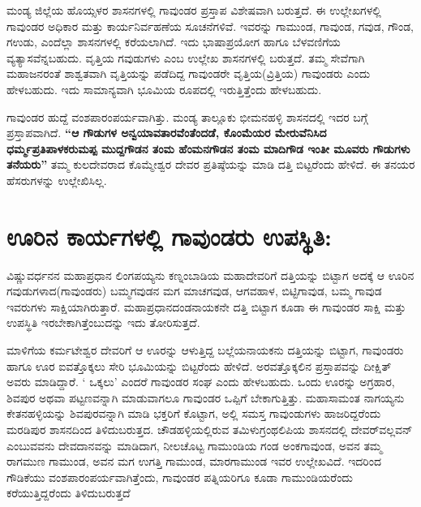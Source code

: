 ಮಂಡ್ಯ ಜಿಲ್ಲೆಯ ಹೊಯ್ಸಳರ ಶಾಸನಗಳಲ್ಲಿ ಗಾವುಂಡರ ಪ್ರಸ್ತಾಪ ವಿಶೇಷವಾಗಿ ಬರುತ್ತದೆ. ಈ ಉಲ್ಲೇಖಗಳಲ್ಲಿ ಗಾವುಂಡರ ಅಧಿಕಾರ ಮತ್ತು ಕಾರ್ಯನಿರ್ವಹಣೆಯ ಸೂಚನೆಗಳಿವೆ. ಇವರನ್ನು ಗಾಮುಂಡ, ಗಾವುಂಡ, ಗವುಡ, ಗೌಂಡ, ಗಉಡು, ಎಂದೆಲ್ಲಾ ಶಾಸನಗಳಲ್ಲಿ ಕರೆಯಲಾಗಿದೆ. ಇದು ಭಾಷಾಪ್ರಯೋಗ ಹಾಗೂ ಬೆಳವಣಿಗೆಯ ವ್ಯತ್ಯಾಸವೆನ್ನಬಹುದು. ವೃತ್ತಿಯ ಗವುಡುಗಳು ಎಂಬ ಉಲ್ಲೇಖ ಶಾಸನಗಳಲ್ಲಿ ಬರುತ್ತದೆ. ತಮ್ಮ ಸೇವೆಗಾಗಿ ಮಹಾಜನರಂತೆ ಶಾಶ್ವತವಾಗಿ ವೃತ್ತಿಯನ್ನು ಪಡೆದಿದ್ದ ಗಾವುಂಡರೇ ವೃತ್ತಿಯ(ವ್ರಿತ್ತಿಯ) ಗಾವುಂಡರು ಎಂದು ಹೇಳಬಹುದು. ಇದು ಸಾಮಾನ್ಯವಾಗಿ ಭೂಮಿಯ ರೂಪದಲ್ಲಿ ಇರುತ್ತಿತ್ತೆಂದು ಹೇಳಬಹುದು.

ಗಾವುಂಡರ ಹುದ್ದೆ ವಂಶಪಾರಂಪರ್ಯವಾಗಿತ್ತು. ಮಂಡ್ಯ ತಾಲ್ಲೂಕು ಭೀಮನಹಳ್ಳಿ ಶಾಸನದಲ್ಲಿ ಇದರ ಬಗ್ಗೆ ಪ್ರಸ್ತಾಪವಾಗಿದೆ. \textbf{“ಆ ಗೌಡುಗಳ ಅನ್ವಯಾವತಾರವೆಂತೆಂದಡೆ, ಕೊಂಮೆಯರ ಮೇರುವೆನಿಸಿದ ಧರ್ಮ್ಮಪ್ರತಿಪಾಳಕರುಮಪ್ಪ ಮುದ್ದಗೌಡನ ತಂಮ ಹೆಂಮನಗೌಡನ ತಂಮ ಮಾದಿಗೌಡ ಇಂತೀ ಮೂವರು ಗೌಡುಗಳು ತನೆಯರು”} ತಮ್ಮ ಕುಲದೇವರಾದ ಕೊಮ್ಮೇಶ್ವರ ದೇವರ ಪ್ರತಿಷ್ಠೆಯನ್ನು ಮಾಡಿ ದತ್ತಿ ಬಿಟ್ಟರೆಂದು ಹೇಳಿದೆ. ಈ ತನಯರ ಹೆಸರುಗಳನ್ನು ಉಲ್ಲೇಖಿಸಿಲ್ಲ.


\section*{ಊರಿನ ಕಾರ್ಯಗಳಲ್ಲಿ ಗಾವುಂಡರು ಉಪಸ್ಥಿತಿ:}

ವಿಷ್ಣುವರ್ಧನನ ಮಹಾಪ್ರಧಾನ ಲಿಂಗಪಯ್ಯನು ಕಣ್ನಂಬಾಡಿಯ ಮಹಾದೇವರಿಗೆ ದತ್ತಿಯನ್ನು ಬಿಟ್ಟಾಗ ಅದಕ್ಕೆ ಆ ಊರಿನ ಗವುಡುಗಳಾದ(ಗಾವುಂಡರು) ಬಮ್ಮಗವುಡನ ಮಗ ಮಾಚಗವುಡ, ಆಗವಹಾಳ, ಬಿಟ್ಟಿಗಾವುಡ, ಬಮ್ಮ ಗಾವುಡ ಇವರುಗಳು ಸಾಕ್ಷಿಯಾಗಿರುತ್ತಾರೆ. ಮಹಾಪ್ರಧಾನದಂಡನಾಯಕನೇ ದತ್ತಿ ಬಿಟ್ಟಾಗ ಕೂಡಾ ಈ ಗಾವುಂಡರ ಸಾಕ್ಷಿ ಮತ್ತು ಉಪಸ್ಥಿತಿ ಇರಬೇಕಾಗಿತ್ತೆಂಬುದನ್ನು ಇದು ತೋರಿಸುತ್ತದೆ.

\vskip 2pt

ಮಾಳಿಗೆಯ ಕರ್ಮಟೇಶ್ವರ ದೇವರಿಗೆ ಆ ಊರನ್ನು ಆಳುತ್ತಿದ್ದ ಬಲ್ಲೆಯನಾಯಕನು ದತ್ತಿಯನ್ನು ಬಿಟ್ಟಾಗ, ಗಾವುಂಡರು ಹಾಗೂ ಊರ ಐವತ್ತೊಕ್ಕಲು ಸೇರಿ ಭೂಮಿಯನ್ನು ಬಿಟ್ಟರೆಂದು ಹೇಳಿದೆ. ಅರವತ್ತೊಕ್ಕಲಿನ ಪ್ರಸ್ತಾಪವನ್ನು ದೀಕ್ಷಿತ್​ ಅವರು ಮಾಡಿದ್ದಾರೆ. ` ಒಕ್ಕಲು' ಎಂದರೆ ಗಾವುಂಡರ ಸಂಘ ಎಂದು ಹೇಳಬಹುದು. ಒಂದು ಊರನ್ನು ಅಗ್ರಹಾರ, ಶಿವಪುರ ಅಥವಾ ಪಟ್ಟಣವನ್ನಾಗಿ ಮಾಡುವಾಗಲೂ ಗಾವುಂಡರ ಒಪ್ಪಿಗೆ ಬೇಕಾಗುತ್ತಿತ್ತು. ಮಹಾಸಾಮಂತ ನಾಗಯ್ಯನು ಕೇತನಹಳ್ಳಿಯನ್ನು ಶಿವಪುರವನ್ನಾಗಿ ಮಾಡಿ ಭಕ್ತರಿಗೆ ಕೊಟ್ಟಾಗ, ಅಲ್ಲಿ ಸಮಸ್ತ ಗಾವುಂಡುಗಳು ಹಾಜರಿದ್ದರೆಂದು ಮರಡಿಪುರ ಶಾಸನದಿಂದ ತಿಳಿದುಬರುತ್ತದ. ಚೌಡಹಳ್ಳಿಯಲ್ಲಿರುವ ತಮಿಳುಗ್ರಂಥಲಿಪಿಯ ಶಾಸನದಲ್ಲಿ ದೇವರ್​ವಲ್ಲವನ್​ ಎಂಬುವವನು ದೇವದಾನವನ್ನು ಮಾಡಿದಾಗ, ನೀಲಚೊಟ್ಟ ಗಾಮುಂಡಿಯ ಗಂಡ ಅಂಕಗಾವುಂಡ, ಅವನ ತಮ್ಮ ರಾಗಮುಣ ಗಾಮುಂಡ, ಅವನ ಮಗ ಉಗತ್ತಿ ಗಾಮುಂಡ, ಮಾರಗಾಮುಂಡ ಇವರ ಉಲ್ಲೇಖವಿದೆ. ಇದರಿಂದ ಗೌಡಿಕೆಯು ವಂಶಪಾರಂಪರ್ಯವಾಗಿತ್ತೆಂದು, ಗಾವುಂಡರ ಪತ್ನಿಯರಿಗೂ ಕೂಡಾ ಗಾಮುಂಡಿಯರೆಂದು ಕರೆಯುತ್ತಿದ್ದರೆಂದು ತಿಳಿದುಬರುತ್ತದೆ


